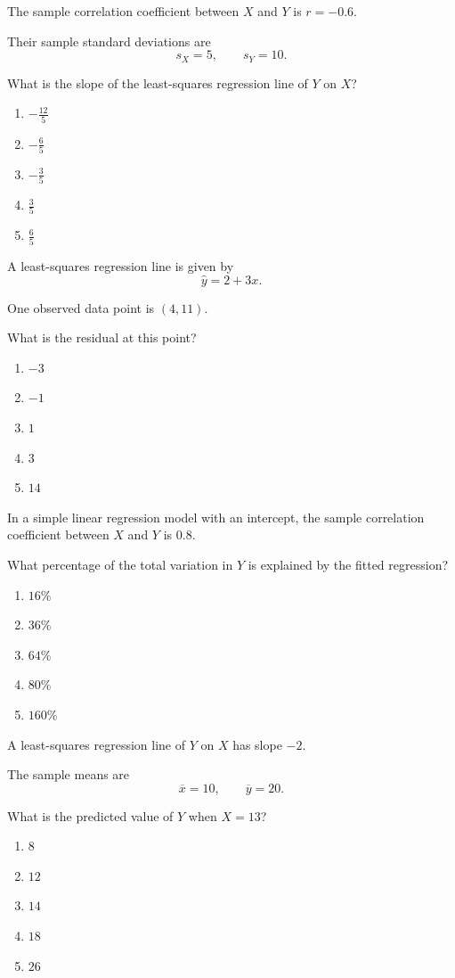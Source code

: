 \begin{exercise}
The sample correlation coefficient between
$X$ and $Y$ is $r=-0.6$.

Their sample standard deviations are
\[
s_X=5,\qquad s_Y=10.
\]

What is the slope of the least-squares
regression line of $Y$ on $X$?

\begin{enumerate}[label=(\Alph*)]
\item $-\frac{12}{5}$
\item $-\frac65$
\item $-\frac35$
\item $\frac35$
\item $\frac65$
\end{enumerate}
\end{exercise}

\begin{exercise}
A least-squares regression line is given by
\[
\widehat y=2+3x.
\]

One observed data point is $(4,11)$.

What is the residual at this point?

\begin{enumerate}[label=(\Alph*)]
\item $-3$
\item $-1$
\item $1$
\item $3$
\item $14$
\end{enumerate}
\end{exercise}

\begin{exercise}
In a simple linear regression model with
an intercept, the sample correlation
coefficient between $X$ and $Y$ is $0.8$.

What percentage of the total variation
in $Y$ is explained by the fitted regression?

\begin{enumerate}[label=(\Alph*)]
\item $16\%$
\item $36\%$
\item $64\%$
\item $80\%$
\item $160\%$
\end{enumerate}
\end{exercise}

\begin{exercise}
A least-squares regression line of $Y$
on $X$ has slope $-2$.

The sample means are
\[
\overline x=10,\qquad\overline y=20.
\]

What is the predicted value of $Y$ when
$X=13$?

\begin{enumerate}[label=(\Alph*)]
\item $8$
\item $12$
\item $14$
\item $18$
\item $26$
\end{enumerate}
\end{exercise}

